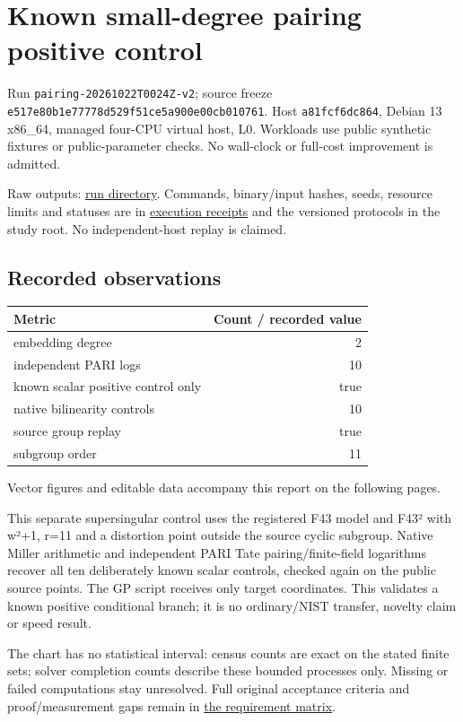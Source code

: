 \documentclass[
  10pt,
  letterpaper,
  landscape]{article}
\author{}
\date{}
\begin{document}
\section{Known small-degree pairing positive
control}\label{known-small-degree-pairing-positive-control}

Run \texttt{pairing-20261022T0024Z-v2}; source freeze
\texttt{e517e80b1e77778d529f51ce5a900e00cb010761}. Host
\texttt{a81fcf6dc864}, Debian 13 x86\_64, managed four-CPU virtual host,
L0. Workloads use public synthetic fixtures or public-parameter checks.
No wall-clock or full-cost improvement is admitted.

Raw outputs:
\href{../../../execution-v1/runs/pairing-20261022T0024Z-v2/}{run
directory}. Commands, binary/input hashes, seeds, resource limits and
statuses are in \href{../../../execution-v1/}{execution receipts} and
the versioned protocols in the study root. No independent-host replay is
claimed.

\subsection{Recorded observations}\label{recorded-observations}

\begin{longtable}[]{@{}lr@{}}
\toprule\noalign{}
Metric & Count / recorded value \\
\midrule\noalign{}
\endhead
\bottomrule\noalign{}
\endlastfoot
embedding degree & 2 \\
independent PARI logs & 10 \\
known scalar positive control only & true \\
native bilinearity controls & 10 \\
source group replay & true \\
subgroup order & 11 \\
\end{longtable}

Vector figures and editable data accompany this report on the following pages.

This separate supersingular control uses the registered F43 model and
F43² with w²+1, r=11 and a distortion point outside the source cyclic
subgroup. Native Miller arithmetic and independent PARI Tate
pairing/finite-field logarithms recover all ten deliberately known
scalar controls, checked again on the public source points. The GP
script receives only target coordinates. This validates a known positive
conditional branch; it is no ordinary/NIST transfer, novelty claim or
speed result.

The chart has no statistical interval: census counts are exact on the
stated finite sets; solver completion counts describe these bounded
processes only. Missing or failed computations stay unresolved. Full
original acceptance criteria and proof/measurement gaps remain in
\href{../../../EXPERIMENTS.md}{the requirement matrix}.
\end{document}
